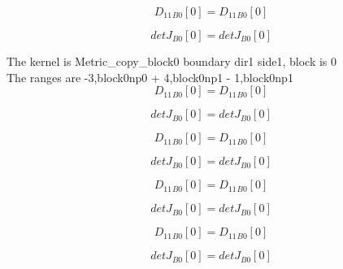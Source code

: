 \documentclass{article}
\begin{document}
\begin{dmath}{D_{11}{_{B0}}}[{0}] = {D_{11}{_{B0}}}[{0}]\end{dmath}

\begin{dmath}{detJ{_{B0}}}[{0}] = {detJ{_{B0}}}[{0}]\end{dmath}

\noindent The kernel is Metric_copy_block0 boundary dir1 side1, block is 0\\\noindent The ranges are -3,block0np0 + 4,block0np1 - 1,block0np1\\\begin{dmath}{D_{11}{_{B0}}}[{0}] = {D_{11}{_{B0}}}[{0}]\end{dmath}

\begin{dmath}{detJ{_{B0}}}[{0}] = {detJ{_{B0}}}[{0}]\end{dmath}

\begin{dmath}{D_{11}{_{B0}}}[{0}] = {D_{11}{_{B0}}}[{0}]\end{dmath}

\begin{dmath}{detJ{_{B0}}}[{0}] = {detJ{_{B0}}}[{0}]\end{dmath}

\begin{dmath}{D_{11}{_{B0}}}[{0}] = {D_{11}{_{B0}}}[{0}]\end{dmath}

\begin{dmath}{detJ{_{B0}}}[{0}] = {detJ{_{B0}}}[{0}]\end{dmath}

\begin{dmath}{D_{11}{_{B0}}}[{0}] = {D_{11}{_{B0}}}[{0}]\end{dmath}

\begin{dmath}{detJ{_{B0}}}[{0}] = {detJ{_{B0}}}[{0}]\end{dmath}
\end{document}
